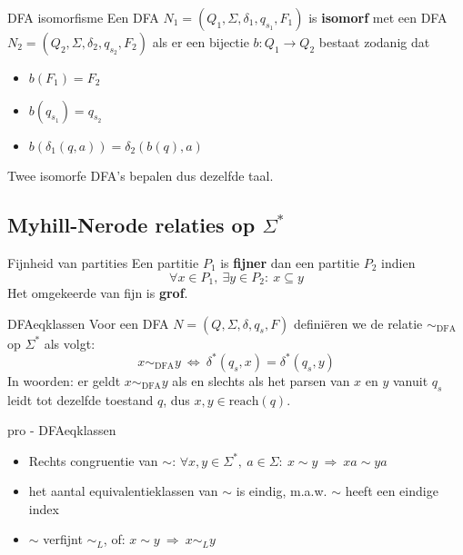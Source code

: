 \newpage

\begin{theo}{DFA isomorfisme}
    Een DFA $N_1 = (Q_1, \Sigma, \delta_1, q_{s_1}, F_1)$ is \textbf{isomorf} met een DFA $N_2 = (Q_2, \Sigma, \delta_2, q_{s_2}, F_2)$ als er een bijectie $b: Q_1 \to Q_2$ bestaat zodanig dat
    \begin{itemize}
        \item $b(F_1) = F_2$
        \item $b(q_{s_1}) = q_{s_2}$
        \item $b(\delta_1(q,a)) = \delta_2(b(q),a)$
    \end{itemize}
    Twee isomorfe DFA's bepalen dus dezelfde taal.
\end{theo}

\subsection{Myhill-Nerode relaties op $\Sigma^*$}

\vspace{0.5cm}

\begin{theo}{Fijnheid van partities}
    Een partitie $P_1$ is \textbf{fijner} dan een partitie $P_2$ indien
    \begin{equation*}
        \forall x \in P_1,\ \exists y \in P_2: \ x \subseteq y
    \end{equation*}
    Het omgekeerde van fijn is \textbf{grof}.
\end{theo}

\begin{theo}{DFAeqklassen}
    Voor een DFA $N = (Q, \Sigma, \delta, q_s, F)$ definiëren we de relatie $\sim_{\text{DFA}}$ op $\Sigma^*$ als volgt:
    \begin{equation*}
        x \sim_{\text{DFA}} y \ \Leftrightarrow \ \delta^*(q_s,x) = \delta^*(q_s,y)
    \end{equation*}
    In woorden: er geldt $x \sim_{\text{DFA}} y$ als en slechts als het parsen van $x$ en $y$ vanuit $q_s$ leidt tot dezelfde toestand $q$, dus $x,y \in \text{reach}(q)$.
\end{theo}

\begin{pro}{pro - DFAeqklassen}
    \begin{itemize}
        \item Rechts congruentie van $\sim$: $\forall x,y \in \Sigma^*, \ a \in \Sigma: \ x \sim y \ \Rightarrow \ xa \sim ya $
        \item het aantal equivalentieklassen van $\sim$ is eindig, m$.$a$.$w$.$ $\sim$ heeft een eindige index
        \item $\sim$ verfijnt $\sim_L$, of: $x \sim y \ \Rightarrow \ x \sim_L y$
    \end{itemize}
\end{pro}

